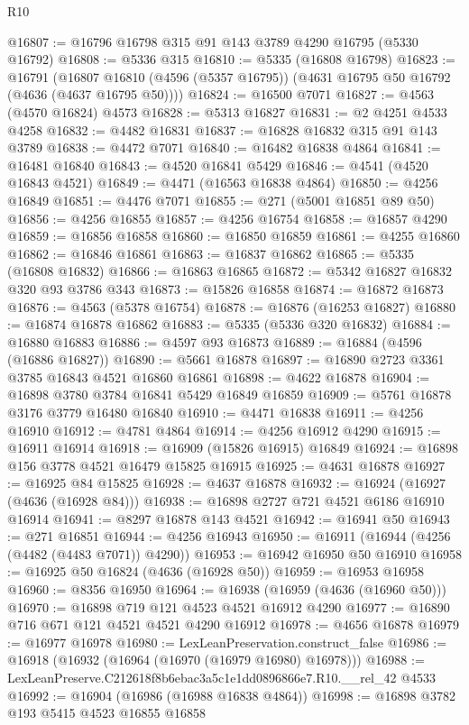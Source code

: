 \begin{lexlean}{R10}
\begin{coremodule}
@16807 := @16796 @16798 @315 @91 @143 @3789 @4290 @16795 (@5330 @16792)
@16808 := @5336 @315
@16810 := @5335 (@16808 @16798)
@16823 := @16791
    (@16807 @16810 (@4596 (@5357 @16795)) (@4631 @16795 @50 @16792 (@4636 (@4637 @16795 @50))))
@16824 := @16500 @7071
@16827 := @4563 (@4570 @16824) @4573
@16828 := @5313 @16827
@16831 := @2 @4251 @4533 @4258
@16832 := @4482 @16831
@16837 := @16828 @16832 @315 @91 @143 @3789
@16838 := @4472 @7071
@16840 := @16482 @16838 @4864
@16841 := @16481 @16840
@16843 := @4520 @16841 @5429
@16846 := @4541 (@4520 @16843 @4521)
@16849 := @4471 (@16563 @16838 @4864)
@16850 := @4256 @16849
@16851 := @4476 @7071
@16855 := @271 (@5001 @16851 @89 @50)
@16856 := @4256 @16855
@16857 := @4256 @16754
@16858 := @16857 @4290
@16859 := @16856 @16858
@16860 := @16850 @16859
@16861 := @4255 @16860
@16862 := @16846 @16861
@16863 := @16837 @16862
@16865 := @5335 (@16808 @16832)
@16866 := @16863 @16865
@16872 := @5342 @16827 @16832 @320 @93 @3786 @343
@16873 := @15826 @16858
@16874 := @16872 @16873
@16876 := @4563 (@5378 @16754)
@16878 := @16876 (@16253 @16827)
@16880 := @16874 @16878 @16862
@16883 := @5335 (@5336 @320 @16832)
@16884 := @16880 @16883
@16886 := @4597 @93 @16873
@16889 := @16884 (@4596 (@16886 @16827))
@16890 := @5661 @16878
@16897 := @16890 @2723 @3361 @3785 @16843 @4521 @16860 @16861
@16898 := @4622 @16878
@16904 := @16898 @3780 @3784 @16841 @5429 @16849 @16859
@16909 := @5761 @16878 @3176 @3779 @16480 @16840
@16910 := @4471 @16838
@16911 := @4256 @16910
@16912 := @4781 @4864
@16914 := @4256 @16912 @4290
@16915 := @16911 @16914
@16918 := @16909 (@15826 @16915) @16849
@16924 := @16898 @156 @3778 @4521 @16479 @15825 @16915
@16925 := @4631 @16878
@16927 := @16925 @84 @15825
@16928 := @4637 @16878
@16932 := @16924 (@16927 (@4636 (@16928 @84)))
@16938 := @16898 @2727 @721 @4521 @6186 @16910 @16914
@16941 := @8297 @16878 @143 @4521
@16942 := @16941 @50
@16943 := @271 @16851
@16944 := @4256 @16943
@16950 := @16911 (@16944 (@4256 (@4482 (@4483 @7071)) @4290))
@16953 := @16942 @16950 @50 @16910
@16958 := @16925 @50 @16824 (@4636 (@16928 @50))
@16959 := @16953 @16958
@16960 := @8356 @16950
@16964 := @16938 (@16959 (@4636 (@16960 @50)))
@16970 := @16898 @719 @121 @4523 @4521 @16912 @4290
@16977 := @16890 @716 @671 @121 @4521 @4521 @4290 @16912
@16978 := @4656 @16878
@16979 := @16977 @16978
@16980 := LexLeanPreservation.construct_false
@16986 := @16918 (@16932 (@16964 (@16970 (@16979 @16980) @16978)))
@16988 := LexLeanPreserve.C212618f8b6ebac3a5c1e1dd0896866e7.R10.__rel_42 @4533
@16992 := @16904 (@16986 (@16988 @16838 @4864))
@16998 := @16898 @3782 @193 @5415 @4523 @16855 @16858

\end{coremodule}
\end{lexlean}
